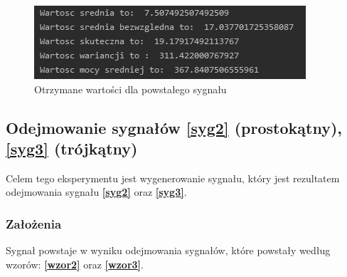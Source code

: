 \documentclass[12pt]{article}
\begin{document}
\begin{figure}[H]
\centering
\includegraphics[scale=0.8]{dodawanieSinusProstParam.png}
\caption{Otrzymane wartości dla powstałego sygnału}
\end{figure}


\subsection{Odejmowanie sygnałów \ref{syg2} (prostokątny), \ref{syg3} (trójkątny)}
\label{syg6}
Celem tego eksperymentu jest wygenerowanie sygnału, który jest rezultatem odejmowania sygnału  \textbf{\ref{syg2}} oraz  \textbf{\ref{syg3}}.
\subsubsection{Założenia}
Sygnał powstaje w wyniku odejmowania sygnałów, które powstały według wzorów:  \textbf{\ref{wzor2}} oraz  \textbf{\ref{wzor3}}.
\end{document}
